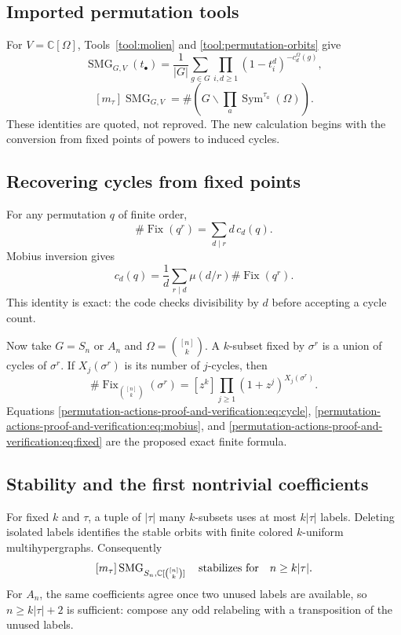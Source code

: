 \documentclass[10pt]{article}
\newcommand{\Sym}{\operatorname{Sym}}
\newcommand{\Fix}{\operatorname{Fix}}
\newcommand{\SMG}{\operatorname{SMG}}
\newcommand{\MGF}{\SMG}
\newcommand{\C}{\mathbb C}
\begin{document}
\subsection{Imported permutation tools}
For $V=\C[\Omega]$, Tools~\ref{tool:molien} and
\ref{tool:permutation-orbits} give
\begin{equation}\label{permutation-actions-proof-and-verification:eq:cycle}
\MGF_{G,V}(t_\bullet)=\frac1{|G|}\sum_{g\in G}
\prod_{i,d\ge1}(1-t_i^d)^{-c_d^\Omega(g)},
\end{equation}
\begin{equation}\label{permutation-actions-proof-and-verification:eq:orbit}
[m_\tau]\MGF_{G,V}=\#\!\left(G\backslash
\prod_a\Sym^{\tau_a}(\Omega)\right).
\end{equation}
These identities are quoted, not reproved. The new calculation begins with
the conversion from fixed points of powers to induced cycles.

\subsection{Recovering cycles from fixed points}
For any permutation $q$ of finite order,
\[
 \#\Fix(q^r)=\sum_{d\mid r}d\,c_d(q).
\]
Mobius inversion gives
\begin{equation}
 \boxed{\displaystyle
 c_d(q)=\frac1d\sum_{r\mid d}\mu(d/r)\#\Fix(q^r).}
 \label{permutation-actions-proof-and-verification:eq:mobius}
\end{equation}
This identity is exact: the code checks divisibility by $d$ before accepting a
cycle count.

Now take $G=S_n$ or $A_n$ and
$\Omega=\binom{[n]}k$.  A $k$-subset fixed by $\sigma^r$ is a union of cycles
of $\sigma^r$.  If $X_j(\sigma^r)$ is its number of $j$-cycles, then
\begin{equation}
 \boxed{\displaystyle
 \#\Fix_{\binom{[n]}k}(\sigma^r)
 =[z^k]\prod_{j\geq1}(1+z^j)^{X_j(\sigma^r)}.}
 \label{permutation-actions-proof-and-verification:eq:fixed}
\end{equation}
Equations \eqref{permutation-actions-proof-and-verification:eq:cycle}, \eqref{permutation-actions-proof-and-verification:eq:mobius}, and \eqref{permutation-actions-proof-and-verification:eq:fixed} are the
proposed exact finite formula.

\subsection{Stability and the first nontrivial coefficients}
For fixed $k$ and $\tau$, a tuple of $|\tau|$ many $k$-subsets uses at most
$k|\tau|$ labels.  Deleting isolated labels identifies the stable orbits with
finite colored $k$-uniform multihypergraphs.  Consequently
\[
 [m_\tau]\MGF_{S_n,\mathbb C[\binom{[n]}k]}
 \quad\hbox{stabilizes for}\quad n\geq k|\tau|.
\]
For $A_n$, the same coefficients agree once two unused labels are available,
so $n\geq k|\tau|+2$ is sufficient: compose any odd relabeling with a
transposition of the unused labels.
\end{document}
